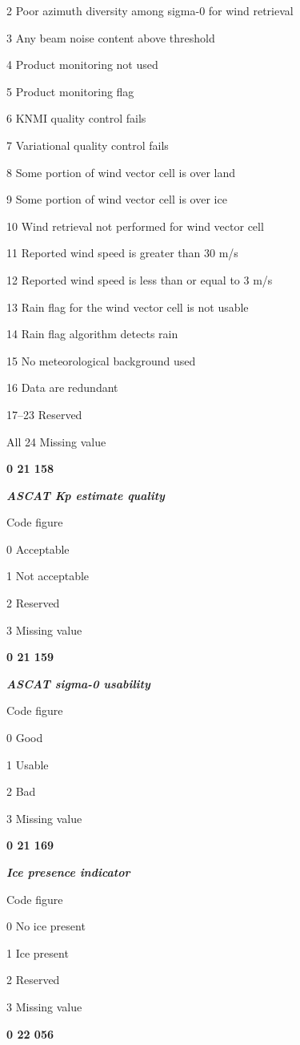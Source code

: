 2 Poor azimuth diversity among sigma-0 for wind retrieval

3 Any beam noise content above threshold

4 Product monitoring not used

5 Product monitoring flag

6 KNMI quality control fails

7 Variational quality control fails

8 Some portion of wind vector cell is over land

9 Some portion of wind vector cell is over ice

10 Wind retrieval not performed for wind vector cell

11 Reported wind speed is greater than 30 m/s

12 Reported wind speed is less than or equal to 3 m/s

13 Rain flag for the wind vector cell is not usable

14 Rain flag algorithm detects rain

15 No meteorological background used

16 Data are redundant

17--23 Reserved

All 24 Missing value

\textbf{0 21 158}

\emph{\textbf{ASCAT Kp estimate quality}}

Code figure

0 Acceptable

1 Not acceptable

2 Reserved

3 Missing value

\textbf{0 21 159}

\emph{\textbf{ASCAT sigma-0 usability}}

Code figure

0 Good

1 Usable

2 Bad

3 Missing value

\textbf{0 21 169}

\emph{\textbf{Ice presence indicator}}

Code figure

0 No ice present

1 Ice present

2 Reserved

3 Missing value

\textbf{0 22 056}

